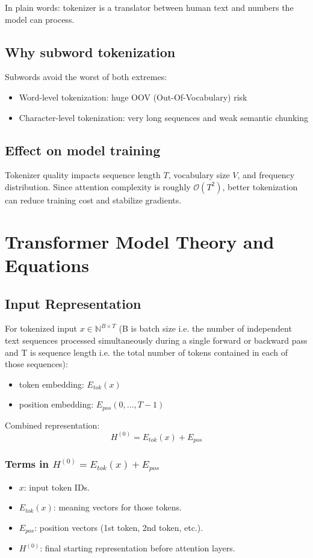 \documentclass[a4paper,11pt]{article}
\begin{document}
In plain words: tokenizer is a translator between human text and numbers the model can process.

\subsection{Why subword tokenization}
Subwords avoid the worst of both extremes:
\begin{itemize}[leftmargin=1.5em]
    \item Word-level tokenization: huge OOV (Out-Of-Vocabulary) risk
    \item Character-level tokenization: very long sequences and weak semantic chunking
\end{itemize}

\subsection{Effect on model training}
Tokenizer quality impacts sequence length $T$, vocabulary size $V$, and frequency distribution.
Since attention complexity is roughly $\mathcal{O}(T^2)$, better tokenization can reduce training cost and stabilize gradients.

\section{Transformer Model Theory and Equations}
\subsection{Input Representation}
For tokenized input $x \in \mathbb{N}^{B \times T}$ (B is batch size i.e. the number of independent text sequences processed simultaneously during a single forward or backward pass and T is sequence length i.e. the total number of tokens contained in each of those sequences):
\begin{itemize}[leftmargin=1.5em]
    \item token embedding: $E_{tok}(x)$
    \item position embedding: $E_{pos}(0,\ldots,T-1)$
\end{itemize}
Combined representation:
\[
H^{(0)} = E_{tok}(x) + E_{pos}
\]

\subsubsection{Terms in $H^{(0)} = E_{tok}(x) + E_{pos}$}
\begin{itemize}[leftmargin=1.5em]
    \item $x$: input token IDs.
    \item $E_{tok}(x)$: meaning vectors for those tokens.
    \item $E_{pos}$: position vectors (1st token, 2nd token, etc.).
    \item $H^{(0)}$: final starting representation before attention layers.
\end{itemize}
\end{document}
